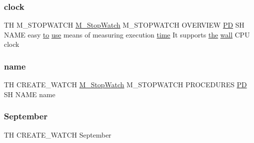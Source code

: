 \subsubsection{\texorpdfstring{clock}{clock}}
{\footnotesize\ttfamily TH M\+\_\+\+S\+T\+O\+P\+W\+A\+T\+CH \hyperlink{option__stopwatch_83_8txt_aa2011fc45a5e502e87ee50996a8a9305}{M\+\_\+\+Stop\+Watch} M\+\_\+\+S\+T\+O\+P\+W\+A\+T\+CH O\+V\+E\+R\+V\+I\+EW \hyperlink{what__overview_81_8txt_a85f26da5a4481fbdb0d9c79f2b94de3e}{PD} SH N\+A\+ME easy \hyperlink{M__stopwatch_83_8txt_a97209fd3e34ef701c0a9734280779cbb}{to} \hyperlink{intro__blas1_83_8txt_a04fa2694d85f67a675bb3f45f7241f48}{use} means of measuring execution \hyperlink{M__stopwatch_83_8txt_a1091fdf3a4e66042d1571c7e4ade98dd}{time} It supports \hyperlink{M__stopwatch_83_8txt_a0f266597de2e57eb3aa964927bb30e14}{the} \hyperlink{M__stopwatch_83_8txt_a78df39f546d66b02c203502a4025b0f4}{wall} C\+PU clock}

\mbox{\label{create__watch_83_8txt_a7952910b2b90c60662fb5b4a4e85427c}} 
\subsubsection{\texorpdfstring{name}{name}}
{\footnotesize\ttfamily TH C\+R\+E\+A\+T\+E\+\_\+\+W\+A\+T\+CH \hyperlink{option__stopwatch_83_8txt_aa2011fc45a5e502e87ee50996a8a9305}{M\+\_\+\+Stop\+Watch} M\+\_\+\+S\+T\+O\+P\+W\+A\+T\+CH P\+R\+O\+C\+E\+D\+U\+R\+ES \hyperlink{what__overview_81_8txt_a85f26da5a4481fbdb0d9c79f2b94de3e}{PD} SH N\+A\+ME name}

\mbox{\label{create__watch_83_8txt_a3f52c4f0a971d6aad8d5872fab85fac6}} 
\subsubsection{\texorpdfstring{September}{September}}
{\footnotesize\ttfamily TH C\+R\+E\+A\+T\+E\+\_\+\+W\+A\+T\+CH September}

